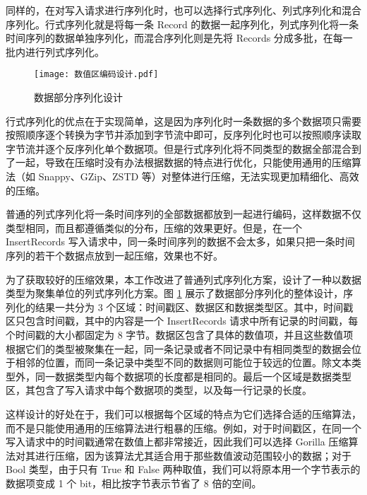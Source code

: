 同样的，在对写入请求进行序列化时，也可以选择行式序列化、列式序列化和混合序列化。行式序列化就是将每一条 Record 的数据一起序列化，列式序列化将一条时间序列的数据单独序列化，而混合序列化则是先将 Records 分成多批，在每一批内进行列式序列化。

\begin{figure} 
  \centering
  \texttt{[image: 数值区编码设计.pdf]}
  \caption{数据部分序列化设计}
  \label{fig:value-encoding-general}
\end{figure}

行式序列化的优点在于实现简单，这是因为序列化时一条数据的多个数据项只需要按照顺序逐个转换为字节并添加到字节流中即可，反序列化时也可以按照顺序读取字节流并逐个反序列化单个数据项。但是行式序列化将不同类型的数据全部混合到了一起，导致在压缩时没有办法根据数据的特点进行优化，只能使用通用的压缩算法（如 Snappy\cite{samulowitz2013snappy}、GZip\cite{deutsch1996gzip}、ZSTD\cite{collet2018zstandard} 等）对整体进行压缩，无法实现更加精细化、高效的压缩。


普通的列式序列化将一条时间序列的全部数据都放到一起进行编码，这样数据不仅类型相同，而且都遵循类似的分布，压缩的效果更好。但是，在一个 InsertRecords 写入请求中，同一条时间序列的数据不会太多，如果只把一条时间序列的若干个数据点放到一起压缩，效果也不好。

为了获取较好的压缩效果，本工作改进了普通列式序列化方案，设计了一种以数据类型为聚集单位的列式序列化方案。图 \ref{fig:value-encoding-general} 展示了数据部分序列化的整体设计，序列化的结果一共分为 3 个区域：时间戳区、数据区和数据类型区。其中，时间戳区只包含时间戳，其中的内容是一个 InsertRecords 请求中所有记录的时间戳，每个时间戳的大小都固定为 8 字节。数据区包含了具体的数值项，并且这些数值项根据它们的类型被聚集在一起，同一条记录或者不同记录中有相同类型的数据会位于相邻的位置，而同一条记录中类型不同的数据则可能位于较远的位置。除文本类型外，同一数据类型内每个数据项的长度都是相同的。最后一个区域是数据类型区，其包含了写入请求中每个数据项的类型，以及每一行记录的长度。

这样设计的好处在于，我们可以根据每个区域的特点为它们选择合适的压缩算法，而不是只能使用通用的压缩算法进行粗暴的压缩。例如，对于时间戳区，在同一个写入请求中的时间戳通常在数值上都非常接近，因此我们可以选择 Gorilla\cite{pelkonen2015gorilla} 压缩算法对其进行压缩，因为该算法尤其适合用于那些数值波动范围较小的数据；对于 Bool 类型，由于只有 True 和 False 两种取值，我们可以将原本用一个字节表示的数据项变成 1 个 bit，相比按字节表示节省了 8 倍的空间。

